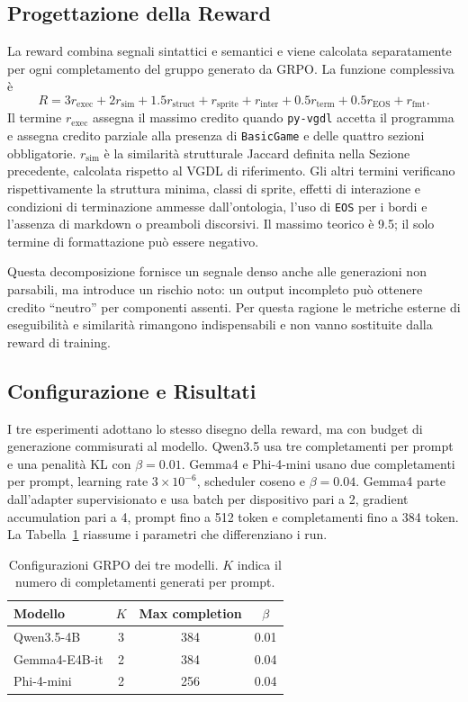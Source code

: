 \documentclass[final,5p,times,twocolumn]{elsarticle}
\begin{document}
\subsection{Progettazione della Reward}

La reward combina segnali sintattici e semantici e viene calcolata separatamente per ogni completamento del gruppo generato da GRPO. La funzione complessiva è
\[
R = 3r_{\mathrm{exec}} + 2r_{\mathrm{sim}} + 1.5r_{\mathrm{struct}}
    + r_{\mathrm{sprite}} + r_{\mathrm{inter}}
    + 0.5r_{\mathrm{term}} + 0.5r_{\mathrm{EOS}} + r_{\mathrm{fmt}}.
\]
Il termine $r_{\mathrm{exec}}$ assegna il massimo credito quando \texttt{py-vgdl} accetta il programma e assegna credito parziale alla presenza di \texttt{BasicGame} e delle quattro sezioni obbligatorie. $r_{\mathrm{sim}}$ è la similarità strutturale Jaccard definita nella Sezione precedente, calcolata rispetto al VGDL di riferimento. Gli altri termini verificano rispettivamente la struttura minima, classi di sprite, effetti di interazione e condizioni di terminazione ammesse dall'ontologia, l'uso di \texttt{EOS} per i bordi e l'assenza di markdown o preamboli discorsivi. Il massimo teorico è 9.5; il solo termine di formattazione può essere negativo.

Questa decomposizione fornisce un segnale denso anche alle generazioni non parsabili, ma introduce un rischio noto: un output incompleto può ottenere credito ``neutro'' per componenti assenti. Per questa ragione le metriche esterne di eseguibilità e similarità rimangono indispensabili e non vanno sostituite dalla reward di training.

\subsection{Configurazione e Risultati}

I tre esperimenti adottano lo stesso disegno della reward, ma con budget di generazione commisurati al modello. Qwen3.5 usa tre completamenti per prompt e una penalità KL con $\beta=0.01$. Gemma4 e Phi-4-mini usano due completamenti per prompt, learning rate $3\times10^{-6}$, scheduler coseno e $\beta=0.04$. Gemma4 parte dall'adapter supervisionato e usa batch per dispositivo pari a 2, gradient accumulation pari a 4, prompt fino a 512 token e completamenti fino a 384 token. La Tabella~\ref{tab:rl-config} riassume i parametri che differenziano i run.

\begin{table}[t]
  \centering
  \small
  \caption{Configurazioni GRPO dei tre modelli. $K$ indica il numero di completamenti generati per prompt.}
  \label{tab:rl-config}
  \begin{tabular}{lccc}
    \toprule
    Modello & $K$ & Max completion & $\beta$ \\
    \midrule
    Qwen3.5-4B & 3 & 384 & 0.01 \\
    Gemma4-E4B-it & 2 & 384 & 0.04 \\
    Phi-4-mini & 2 & 256 & 0.04 \\
    \bottomrule
  \end{tabular}
\end{table}
\end{document}
